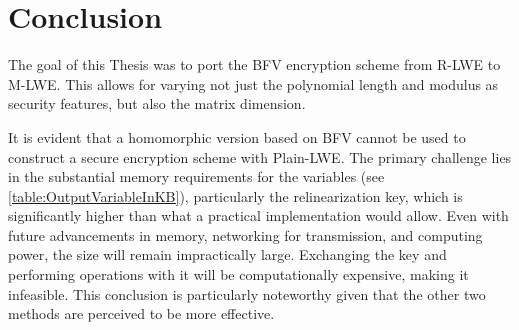\chapter{Conclusion}

The goal of this Thesis was to port the BFV encryption scheme from R-LWE to M-LWE. This allows for varying not just the polynomial length and modulus as security features, but also the matrix dimension.







It is evident that a homomorphic version based on BFV \cite{bfv} cannot be used to construct a secure encryption scheme with Plain-LWE. The primary challenge lies in the substantial memory requirements for the variables (see \ref{table:OutputVariableInKB}), particularly the relinearization key, which is significantly higher than what a practical implementation would allow. Even with future advancements in memory, networking for transmission, and computing power, the size will remain impractically large. Exchanging the key and performing operations with it will be computationally expensive, making it infeasible. This conclusion is particularly noteworthy given that the other two methods are perceived to be more effective.


